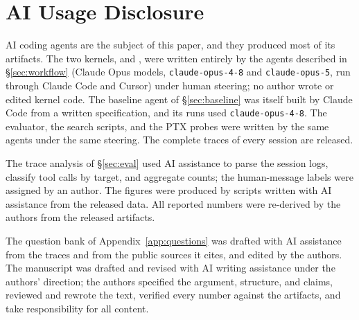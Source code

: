 \section*{AI Usage Disclosure}

AI coding agents are the subject of this paper, and they produced most of its artifacts. The two
kernels, \fathree and \fafour, were written entirely by the agents described in \S\ref{sec:workflow}
(Claude Opus models, \texttt{claude-opus-4-8} and \texttt{claude-opus-5}, run through Claude Code
and Cursor) under human steering; no author wrote or edited kernel code. The baseline agent of
\S\ref{sec:baseline} was itself built by Claude Code from a written specification, and its runs used
\texttt{claude-opus-4-8}. The evaluator, the search scripts, and the PTX probes were written by the
same agents under the same steering. The complete traces of every session are released.

The trace analysis of \S\ref{sec:eval} used AI assistance to parse the session logs, classify tool
calls by target, and aggregate counts; the human-message labels were assigned by an author. The
figures were produced by scripts written with AI assistance from the released data. All reported
numbers were re-derived by the authors from the released artifacts.

The question bank of Appendix~\ref{app:questions} was drafted with AI assistance from the traces and
from the public sources it cites, and edited by the authors. The manuscript was drafted and revised
with AI writing assistance under the authors' direction; the authors specified the argument,
structure, and claims, reviewed and rewrote the text, verified every number against the artifacts,
and take responsibility for all content.
